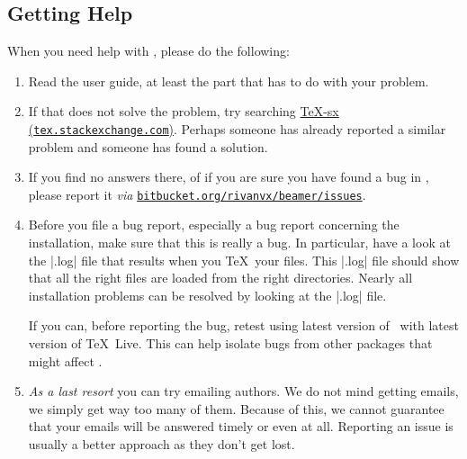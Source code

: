 \subsection{Getting Help}

When you need help with \beamer, please do the following:
\begin{enumerate}
\item
  Read the user guide, at least the part that has to do with your problem.
\item
  If that does not solve the problem, try searching \href{http://tex.stackexchange.com}{TeX-sx (\texttt{tex.stackexchange.com})}.
  Perhaps someone has already reported a similar problem and someone has found a solution.
\item
  If you find no answers there, of if you are sure you have found a bug in
  \beamer{}, please report it \emph{via} \href{https://bitbucket.org/rivanvx/beamer/issues}{\texttt{bitbucket.org/rivanvx/beamer/issues}}.
\item
  Before you file a bug report, especially a bug report concerning the installation, make sure that this is really a bug. In particular, have a look at the |.log| file that results when you \TeX\ your files. This |.log| file should show that all the right files are loaded from the right directories. Nearly all installation problems can be resolved by looking at the |.log| file.

  If you can, before reporting the bug, retest using latest version of \beamer\ with latest version of \TeX\ Live. This can help isolate bugs from other packages that might affect \beamer.
\item
  \emph{As a last resort} you can try emailing authors. We do not mind getting emails, we simply get way too many of them. Because of this, we cannot guarantee that your emails will be answered timely or even at all. Reporting
an issue is usually a better approach as they don't get lost.
\end{enumerate}
